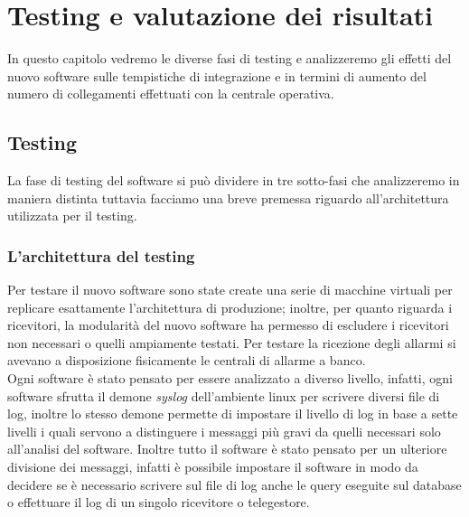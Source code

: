 \chapter{Testing e valutazione dei risultati}
\label{capitolo7}
\thispagestyle{empty}
In questo capitolo vedremo le diverse fasi di testing e analizzeremo gli effetti del nuovo software sulle tempistiche di integrazione e in termini di aumento del numero di collegamenti effettuati con la centrale operativa.
\section{Testing}
La fase di testing del software si può dividere in tre sotto-fasi che analizzeremo in maniera distinta tuttavia facciamo una breve premessa riguardo all'architettura utilizzata per il testing.
\subsection{L'architettura del testing}
Per testare il nuovo software sono state create una serie di macchine virtuali per replicare esattamente l'architettura di produzione; inoltre, per quanto riguarda i ricevitori, la modularità del nuovo software ha permesso di escludere i ricevitori non necessari o quelli ampiamente testati. Per testare la ricezione degli allarmi si avevano a disposizione fisicamente le centrali di allarme a banco.\\
Ogni software è stato pensato per essere analizzato a diverso livello, infatti, ogni software sfrutta il demone \emph{syslog} dell'ambiente linux per scrivere diversi file di log, inoltre lo stesso demone permette di impostare il livello di log in base a sette livelli i quali servono a distinguere i messaggi più gravi da quelli necessari solo all'analisi del software. Inoltre tutto il software è stato pensato per un ulteriore divisione dei messaggi, infatti è possibile impostare il software in modo da decidere se è necessario scrivere sul file di log anche le query eseguite sul database o effettuare il log di un singolo ricevitore o telegestore.
